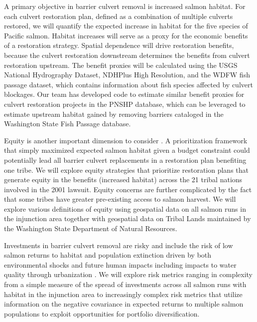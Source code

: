\documentclass[12pt]{elsarticle}
\begin{document}
A primary objective in barrier culvert removal is increased salmon habitat. For each culvert restoration plan, defined as a combination of multiple culverts restored, we will quantify the expected increase in habitat for the five species of Pacific salmon. Habitat increases will serve as a proxy for the economic benefits of a restoration strategy. Spatial dependence will drive restoration benefits, because the culvert restoration downstream determines the benefits from culvert restoration upstream. The benefit proxies will be calculated using the USGS National Hydrography Dataset, NDHPlus High Resolution, and the WDFW fish passage dataset, which contains information about fish species affected by culvert blockages.  Our team has developed code to estimate similar benefit proxies for culvert restoration projects in the PNSHP database, which can be leveraged to estimate upstream habitat gained by removing barriers cataloged in the Washington State Fish Passage database. 

%
Equity is another important dimension to consider . A prioritization framework that simply maximized expected salmon habitat given a budget constraint could potentially lead all barrier culvert replacements in a restoration plan benefiting one tribe. We will explore equity strategies that prioritize restoration plans that generate equity in the benefits (increased habitat) across the 21 tribal nations involved in the 2001 lawsuit. Equity concerns are further complicated by the fact that some tribes have greater pre-existing access to salmon harvest. We will explore various definitions of equity using geospatial data on all salmon runs in the injunction area together with geospatial data on Tribal Lands maintained by the Washington State Department of Natural Resources. 

%
Investments in barrier culvert removal are risky and include the risk of low salmon returns to habitat and population extinction driven by both environmental shocks and future human impacts including impacts to water quality through urbanization \citep{ettinger2021prioritizing}. We will explore risk metrics ranging in complexity from a simple measure of the spread of investments across all salmon runs with habitat in the injunction area to increasingly complex risk metrics that utilize information on the negative covariance in expected returns to multiple salmon populations to exploit opportunities for portfolio diversification.  

\end{document}
